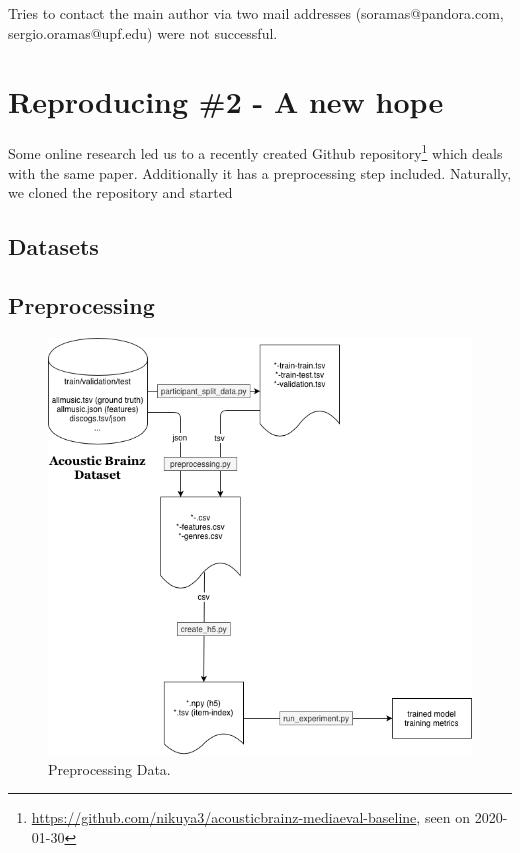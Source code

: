 \documentclass[sigconf,nonacm]{acmart}
\begin{document}
Tries to contact the main author via two mail addresses (soramas@pandora.com, sergio.oramas@upf.edu) were not successful.


\section{Reproducing \#2 - A new hope} 

Some online research led us to a recently created Github repository\footnote{\url{https://github.com/nikuya3/acousticbrainz-mediaeval-baseline}, seen on 2020-01-30} which deals with the same paper. Additionally it has a preprocessing step included. Naturally, we cloned the repository and started \textit{}


\subsection{Datasets}

\subsection{Preprocessing}
  \begin{figure}
    \includegraphics[width=\linewidth]{Preprocess-Data.png}
    \caption{Preprocessing Data.}
    \label{fig:preprocess}
  \end{figure}
\end{document}
